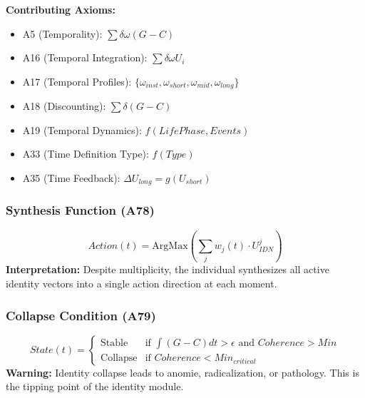 \textbf{Contributing Axioms:}
\begin{itemize}
\item A5 (Temporality): $\sum \delta \omega (G - C)$
\item A16 (Temporal Integration): $\sum \delta \omega U_i$
\item A17 (Temporal Profiles): $\{\omega_{inst}, \omega_{short}, \omega_{mid}, \omega_{long}\}$
\item A18 (Discounting): $\sum \delta (G - C)$
\item A19 (Temporal Dynamics): $f(LifePhase, Events)$
\item A33 (Time Definition Type): $f(Type)$
\item A35 (Time Feedback): $\Delta U_{long} = g(U_{short})$
\end{itemize}

\subsubsection{Synthesis Function (A78)}

\begin{tcolorbox}[colback=orange!5!white, colframe=orange!50!black]
\begin{equation}
\boxed{
Action(t) = \text{ArgMax}\left( \sum_j w_j(t) \cdot U^j_{IDN} \right)
}
\end{equation}
\textbf{Interpretation:} Despite multiplicity, the individual synthesizes all active identity vectors into a single action direction at each moment.
\end{tcolorbox}

\subsubsection{Collapse Condition (A79)}

\begin{tcolorbox}[colback=red!5!white, colframe=red!50!black]
\begin{equation}
\boxed{
State(t) = \begin{cases} 
\text{Stable} & \text{if } \int (G - C) dt > \epsilon \text{ and } Coherence > Min \\
\text{Collapse} & \text{if } Coherence < Min_{critical}
\end{cases}
}
\end{equation}
\textbf{Warning:} Identity collapse leads to anomie, radicalization, or pathology. This is the tipping point of the identity module.
\end{tcolorbox}


